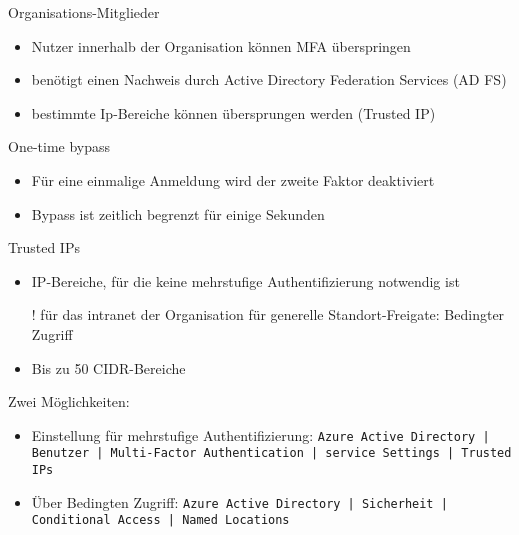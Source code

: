 
\begin{flashcard}[Definition]{Organisations-Mitglieder}
    \begin{itemize}
        \item Nutzer innerhalb der Organisation können MFA überspringen
        \item benötigt einen Nachweis durch Active Directory Federation Services (AD FS)
        \item bestimmte Ip-Bereiche können übersprungen werden (Trusted IP)
    \end{itemize}
\end{flashcard}

\begin{flashcard}[Definition]{One-time bypass}
    \begin{itemize}
        \item Für eine einmalige Anmeldung wird der zweite Faktor deaktiviert
        \item Bypass ist zeitlich begrenzt für einige Sekunden
    \end{itemize}
\end{flashcard}


\begin{flashcard}[Definition]{Trusted IPs}
    \begin{itemize}
        \item IP-Bereiche, für die keine mehrstufige Authentifizierung notwendig ist
        \item[!] für das intranet der Organisation\newline
            für generelle Standort-Freigate: Bedingter Zugriff
        \item Bis zu 50 CIDR-Bereiche
    \end{itemize}
    Zwei Möglichkeiten:
    \begin{itemize}
        \item Einstellung für mehrstufige Authentifizierung:\newline
            \texttt{Azure Active Directory | Benutzer | Multi-Factor Authentication | service Settings | Trusted IPs}
        \item Über Bedingten Zugriff:\newline
            \texttt{Azure Active Directory | Sicherheit | Conditional Access | Named Locations}
    \end{itemize}

\end{flashcard}

